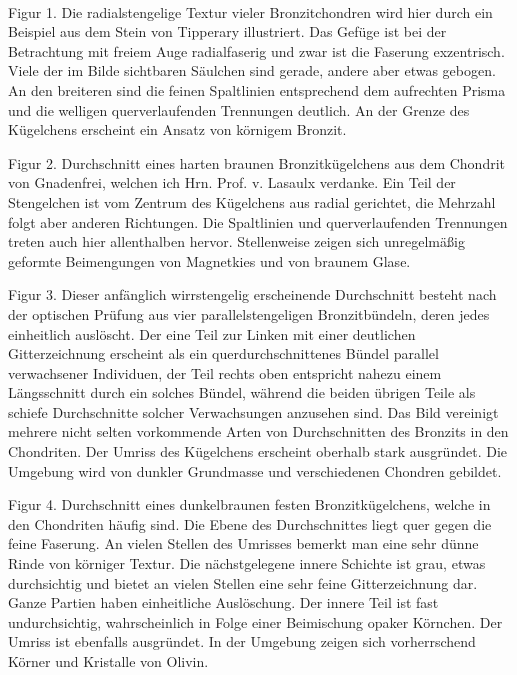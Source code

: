 \documentclass[a4paper, 11pt, oneside, polutonikogreek, german]{article}
\begin{document}
\paragraph{}
Figur 1. Die radialstengelige Textur vieler Bronzitchondren wird hier durch ein Beispiel aus dem Stein von Tipperary illustriert. Das Gefüge ist bei der Betrachtung mit freiem Auge radialfaserig und zwar ist die Faserung exzentrisch. Viele der im Bilde sichtbaren Säulchen sind gerade, andere aber etwas gebogen. An den breiteren sind die feinen Spaltlinien entsprechend dem aufrechten Prisma und die welligen querverlaufenden Trennungen deutlich. An der Grenze des Kügelchens erscheint ein Ansatz von körnigem Bronzit.

Figur 2. Durchschnitt eines harten braunen Bronzitkügelchens aus dem Chondrit von Gnadenfrei, welchen ich Hrn. Prof. v. Lasaulx verdanke. Ein Teil der Stengelchen ist vom Zentrum des Kügelchens aus radial gerichtet, die Mehrzahl folgt aber anderen Richtungen. Die Spaltlinien und querverlaufenden Trennungen treten auch hier allenthalben hervor. Stellenweise zeigen sich unregelmäßig geformte Beimengungen von Magnetkies und von braunem Glase.

Figur 3. Dieser anfänglich wirrstengelig erscheinende Durchschnitt besteht nach der optischen Prüfung aus vier parallelstengeligen Bronzitbündeln, deren jedes einheitlich auslöscht. Der eine Teil zur Linken mit einer deutlichen Gitterzeichnung erscheint als ein querdurchschnittenes Bündel parallel verwachsener Individuen, der Teil rechts oben entspricht nahezu einem Längsschnitt durch ein solches Bündel, während die beiden übrigen Teile als schiefe Durchschnitte solcher Verwachsungen anzusehen sind. Das Bild vereinigt mehrere nicht selten vorkommende Arten von Durchschnitten des Bronzits in den Chondriten. Der Umriss des Kügelchens erscheint oberhalb stark ausgründet. Die Umgebung wird von dunkler Grundmasse und verschiedenen Chondren gebildet.

Figur 4. Durchschnitt eines dunkelbraunen festen Bronzitkügelchens, welche in den Chondriten häufig sind. Die Ebene des Durchschnittes liegt quer gegen die feine Faserung. An vielen Stellen des Umrisses bemerkt man eine sehr dünne Rinde von körniger Textur. Die nächstgelegene innere Schichte ist grau, etwas durchsichtig und bietet an vielen Stellen eine sehr feine Gitterzeichnung dar. Ganze Partien haben einheitliche Auslöschung. Der innere Teil ist fast undurchsichtig, wahrscheinlich in Folge einer Beimischung opaker Körnchen. Der Umriss ist ebenfalls ausgründet. In der Umgebung zeigen sich vorherrschend Körner und Kristalle von Olivin.
\clearpage
\end{document}
